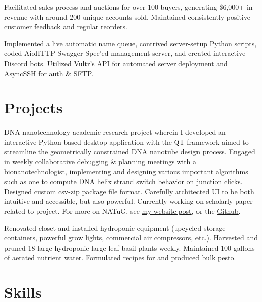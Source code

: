 \documentclass[letterpaper, 10pt]{article}
\begin{document}
		{Facilitated sales process and auctions for over 100 buyers, generating \$6,000+ in revenue with around 200 unique accounts sold. Maintained consistently positive customer feedback and regular reorders.}
		
		{Implemented a live automatic name queue, contrived server-setup Python scripts, coded AioHTTP Swagger-Spec'ed management server, and created interactive Discord bots. Utilized Vultr's API for automated server deployment and AsyncSSH for auth \& SFTP.}
	\resumeItemListEnd
	
	\resumeSubHeadingListEnd
	
	\section{Projects}
	\resumeSubHeadingListStart
		{DNA nanotechnology academic research project wherein I developed an interactive Python based desktop application with the QT framework aimed to streamline the geometrically constrained DNA nanotube design process. Engaged in weekly collaborative debugging \& planning meetings with a bionanotechnologist, implementing and designing various important algorithms such as one to compute DNA helix strand switch behavior on junction clicks. Designed custom csv-zip package file format. Carefully architected UI to be both intuitive and accessible, but also powerful. Currently working on scholarly paper related to project. For more on NATuG, see \href{https://404wolf.com/posts/projects/DNANanotubes}{\ul{my website post}}, or the \href{https://github.com/NATuG3/NATuG3}{\ul{Github}}.}
		
		{Renovated closet and installed hydroponic equipment (upcycled storage containers, powerful grow lights, commercial air compressors, etc.). Harvested and pruned 18 large hydroponic large-leaf basil plants weekly. Maintained 100 gallons of aerated nutrient water. Formulated recipes for and produced bulk pesto.}
	\resumeSubHeadingListEnd
	
	\section{Skills}
	\resumeSubHeadingListStart
	
	
	
	\resumeSubHeadingListEnd
\end{document}
